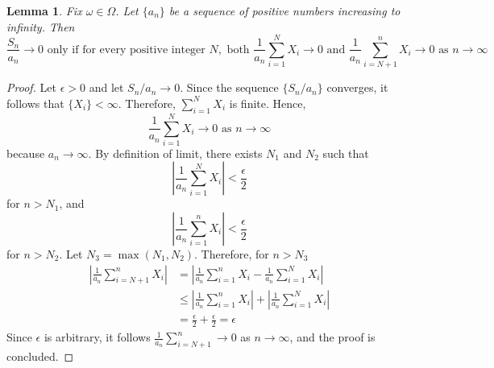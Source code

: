 \documentclass[letterpaper, 12pt]{article}
\newtheorem{lem}{Lemma}
\begin{document}
\begin{lem}
Fix $\omega \in \Omega$.
Let $\{a_n\}$ be a sequence of positive numbers increasing to infinity. Then
\[
\frac{S_n}{a_n} \to 0 \text{ only if for every positive integer } 
N, \text{ both }
\frac{1}{a_n} \sum_{i=1}^N X_i \to 0
\text{ and }
\frac{1}{a_n} \sum_{i=N+1}^n X_i \to 0
\text{ as } n \to \infty
\]
\end{lem}
\begin{proof}
Let $\epsilon > 0$ and let $S_n/a_n \to 0$. Since the sequence $\{S_n/a_n\}$ converges, it follows that $\{X_i\} < \infty$. Therefore, $\sum_{i=1}^N X_i$ is finite. Hence, 
\[
\frac{1}{a_n} \sum_{i=1}^N X_i \to 0 \text{ as } n \to \infty
\]
because $a_n \to \infty$. By definition of limit, there exists $N_1$ and $N_2$ such that
\[
\left\lvert \frac{1}{a_n} \sum_{i=1}^N X_i \right\rvert < \frac{\epsilon}{2}
\]
for $n > N_1$, and 
\[
\left\lvert \frac{1}{a_n} \sum_{i=1}^n X_i \right\rvert < \frac{\epsilon}{2}
\]
for $n > N_2$. Let $N_3 = \max(N_1, N_2)$. Therefore, for $n > N_3$
\begin{align*}
\left\lvert \frac{1}{a_n} \sum_{i=N+1}^n X_i \right\rvert 
&=
\left\lvert \frac{1}{a_n} \sum_{i=1}^n X_i  - \frac{1}{a_n}
\sum_{i=1}^N X_i
\right\rvert 
\\
&\leq
\left\lvert \frac{1}{a_n} \sum_{i=1}^n X_i \right\rvert
+
\left\lvert 
\frac{1}{a_n}
\sum_{i=1}^N X_i
\right\rvert 
\\
&=
\frac{\epsilon}{2}
+ 
\frac{\epsilon}{2}
=
\epsilon
\end{align*}
Since $\epsilon$ is arbitrary, it follows $\frac{1}{a_n} \sum_{i=N+1}^n \to 0$ as $n \to \infty$, and the proof is concluded.
\end{proof}
\end{document}
